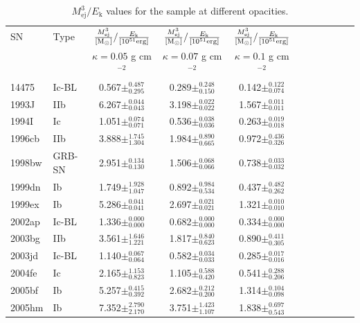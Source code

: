 \documentclass[a4paper,fleqn,usenatbib]{mnras}
\begin{document}
\begin{table}
\renewcommand{\arraystretch}{1.5}
 \centering
 \begin{minipage}{140mm}
  \caption{$M_{\mathrm{ej}}^3/E_{\mathrm{k}}$ values for the sample at different opacities.}
 \begin{tabular}{@{}llcccccclcc@{}}
  \hline
 SN & Type & $\frac{M_{\mathrm{ej}}^3}{[{\rm M}_\odot]}/ \frac{E_{\mathrm{k}}}{[10^{51}\mathrm{ erg}]}$  & $\frac{M_{\mathrm{ej}}^3}{[{\rm M}_\odot]}/ \frac{E_{\mathrm{k}}}{[10^{51}\mathrm{ erg}]}$ & $\frac{M_{\mathrm{ej}}^3}{[{\rm M}_\odot]}/ \frac{E_{\mathrm{k}}}{[10^{51}\mathrm{ erg}]}$ &  \\
 & & $\kappa = 0.05$ g cm$^{-2}$ & $\kappa = 0.07$ g cm$^{-2}$ & $\kappa = 0.1$ g cm$^{-2}$ \\
  \hline
14475 & Ic-BL & 0.567$ \pm^{0.487}_{0.295}$ &0.289$ \pm^{0.248}_{0.150}$ &0.142$ \pm^{0.122}_{0.074}$ \\
1993J & IIb & 6.267$ \pm^{0.044}_{0.043}$ &3.198$ \pm^{0.022}_{0.022}$ &1.567$ \pm^{0.011}_{0.011}$ \\
1994I & Ic & 1.051$ \pm^{0.074}_{0.071}$ &0.536$ \pm^{0.038}_{0.036}$ &0.263$ \pm^{0.019}_{0.018}$ \\
1996cb & IIb & 3.888$ \pm^{1.745}_{1.304}$ &1.984$ \pm^{0.890}_{0.665}$ &0.972$ \pm^{0.436}_{0.326}$ \\
1998bw & GRB-SN & 2.951$ \pm^{0.134}_{0.130}$ &1.506$ \pm^{0.068}_{0.066}$ &0.738$ \pm^{0.033}_{0.032}$ \\
1999dn & Ib & 1.749$ \pm^{1.928}_{1.047}$ &0.892$ \pm^{0.984}_{0.534}$ &0.437$ \pm^{0.482}_{0.262}$ \\
1999ex & Ib & 5.286$ \pm^{0.041}_{0.041}$ &2.697$ \pm^{0.021}_{0.021}$ &1.321$ \pm^{0.010}_{0.010}$ \\
2002ap & Ic-BL & 1.336$ \pm^{0.000}_{0.000}$ &0.682$ \pm^{0.000}_{0.000}$ &0.334$ \pm^{0.000}_{0.000}$ \\
2003bg & IIb & 3.561$ \pm^{1.646}_{1.221}$ &1.817$ \pm^{0.840}_{0.623}$ &0.890$ \pm^{0.411}_{0.305}$ \\
2003jd & Ic-BL & 1.140$ \pm^{0.067}_{0.064}$ &0.582$ \pm^{0.034}_{0.033}$ &0.285$ \pm^{0.017}_{0.016}$ \\
2004fe & Ic & 2.165$ \pm^{1.153}_{0.823}$ &1.105$ \pm^{0.588}_{0.420}$ &0.541$ \pm^{0.288}_{0.206}$ \\
2005bf & Ib & 5.257$ \pm^{0.415}_{0.392}$ &2.682$ \pm^{0.212}_{0.200}$ &1.314$ \pm^{0.104}_{0.098}$ \\
2005hm & Ib & 7.352$ \pm^{2.790}_{2.170}$ &3.751$ \pm^{1.423}_{1.107}$ &1.838$ \pm^{0.697}_{0.543}$ \\

\end{tabular}
\end{minipage}
\end{table}
\end{document}

